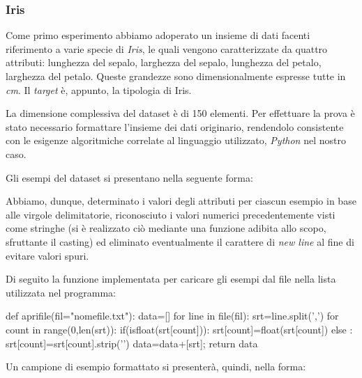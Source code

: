 		\subsubsection{Iris}
			Come primo esperimento abbiamo adoperato un insieme di dati facenti riferimento a varie specie di \emph{Iris}, le quali vengono caratterizzate da quattro attributi: lunghezza del sepalo, larghezza del sepalo, lunghezza del petalo, larghezza del petalo. Queste grandezze sono dimensionalmente espresse tutte in \emph{cm}. Il \emph{target} è, appunto, la tipologia di Iris.\par
			La dimensione complessiva del dataset è di 150 elementi. Per effettuare la prova è stato necessario formattare l'insieme dei dati originario, rendendolo consistente con le esigenze algoritmiche correlate al linguaggio utilizzato, \emph{Python} nel nostro caso.\par
			Gli esempi del dataset si presentano nella seguente forma:
			
			Abbiamo, dunque, determinato i valori degli attributi per ciascun esempio in base alle virgole delimitatorie, riconosciuto i valori numerici precedentemente visti come stringhe (si è realizzato ciò mediante una funzione adibita allo scopo, sfruttante il casting) ed eliminato eventualmente il carattere di \textit{new line} al fine di evitare valori spuri.\par
			Di seguito la funzione implementata per caricare gli esempi dal file nella lista utilizzata nel programma:
			\medskip
			\begin{python}
		def aprifile(fil="nomefile.txt"):
			data=[]
			for line in file(fil):
				srt=line.split(',')
				for count in range(0,len(srt)):
					if(isfloat(srt[count])):
						srt[count]=float(srt[count])
					else :
						srt[count]=srt[count].strip('\n')
				data=data+[srt];
			return data
			\end{python}
			\bigskip
			Un campione di esempio formattato si presenterà, quindi, nella forma:
			
		
